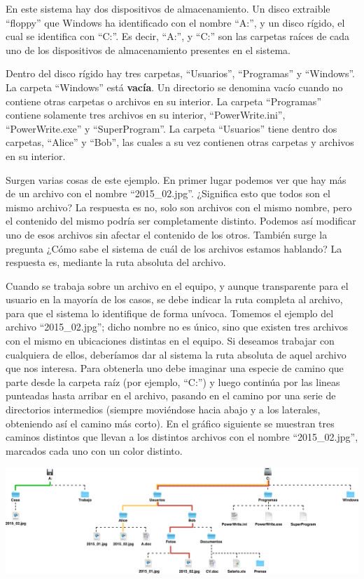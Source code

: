 En este sistema hay dos dispositivos de almacenamiento. Un disco extraible ``floppy''
que Windows ha identificado con el nombre ``A:'', y un disco rígido, el cual se
identifica con ``C:''. Es decir, ``A:'', y ``C:'' son las carpetas raíces de cada
uno de los dispositivos de almacenamiento presentes en el sistema.

Dentro del disco rígido hay tres carpetas, ``Usuarios'', ``Programas'' y ``Windows''.
La carpeta ``Windows'' está \textbf{vacía}. Un directorio se denomina vacío
cuando no contiene otras carpetas o archivos en su interior. La carpeta
``Programas'' contiene solamente tres archivos en su interior, ``PowerWrite.ini'',
``PowerWrite.exe'' y ``SuperProgram''. La carpeta ``Usuarios'' tiene dentro
dos carpetas, ``Alice'' y ``Bob'', las cuales a su vez contienen otras carpetas
y archivos en su interior.

Surgen varias cosas de este ejemplo. En primer lugar podemos ver que hay más de
un archivo con el nombre ``2015\_02.jpg''. ¿Significa esto que todos son el mismo
archivo? La respuesta es no, solo son archivos con el mismo nombre, pero el
contenido del mismo podría ser completamente distinto. Podemos así modificar uno
de esos archivos sin afectar el contenido de los otros. También surge la
pregunta ¿Cómo sabe el sistema de cuál de los archivos estamos hablando? La
respuesta es, mediante la ruta absoluta del archivo.

Cuando se trabaja sobre un archivo en el equipo, y aunque transparente para el
usuario en la mayoría de los casos, se debe indicar la ruta completa al archivo,
para que el sistema lo identifique de forma unívoca. Tomemos el ejemplo del archivo
``2015\_02.jpg''; dicho nombre no es único, sino que existen tres archivos con
el mismo en ubicaciones distintas en el equipo. Si deseamos trabajar con cualquiera
de ellos, deberíamos dar al sistema la ruta absoluta de aquel archivo que nos
interesa. Para obtenerla uno debe imaginar una especie de camino que parte desde la
carpeta raíz (por ejemplo, ``C:'') y luego continúa por las lineas punteadas hasta
arribar en el archivo, pasando en el camino por una serie de directorios intermedios
(siempre moviéndose hacia abajo y a los laterales, obteniendo así el camino más corto).
En el gráfico siguiente se muestran tres caminos distintos que llevan a los distintos
archivos con el nombre ``2015\_02.jpg'', marcados cada uno con un color distinto.

\vspace{0.5cm}
\centerline{\includegraphics[scale=0.35]{capitulos/informatica/imagenes/directorios_windows_2.png}}

